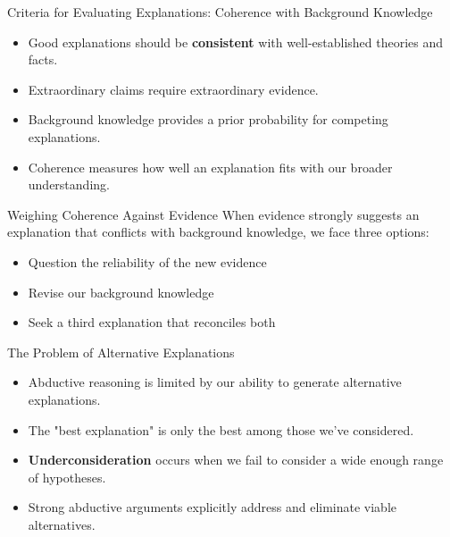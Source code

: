 \documentclass{beamer}
\begin{document}
\begin{frame}{Criteria for Evaluating Explanations: Coherence with Background Knowledge}
    \begin{itemize}
        \item Good explanations should be \textbf{consistent} with well-established theories and facts.
        \item Extraordinary claims require extraordinary evidence.
        \item Background knowledge provides a prior probability for competing explanations.
        \item Coherence measures how well an explanation fits with our broader understanding.
    \end{itemize}
    
    \begin{alertblock}{Weighing Coherence Against Evidence}
        When evidence strongly suggests an explanation that conflicts with background knowledge, we face three options:
        \begin{itemize}
            \item Question the reliability of the new evidence
            \item Revise our background knowledge
            \item Seek a third explanation that reconciles both
        \end{itemize}
    \end{alertblock}
\end{frame}

\begin{frame}{The Problem of Alternative Explanations}
    \begin{itemize}
        \item Abductive reasoning is limited by our ability to generate alternative explanations.
        \item The "best explanation" is only the best among those we've considered.
        \item \textbf{Underconsideration} occurs when we fail to consider a wide enough range of hypotheses.
        \item Strong abductive arguments explicitly address and eliminate viable alternatives.
    \end{itemize}
    
\end{frame}
\end{document}
